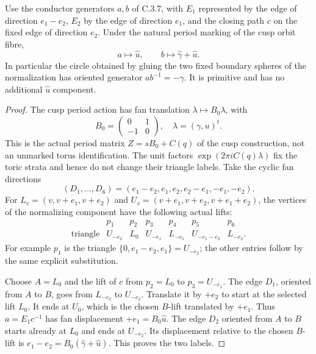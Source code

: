 \begin{lemma}
Use the conductor generators \(a,b\) of C.3.7, with
\(E_1\) represented by the edge of direction \(e_1-e_2\),
\(E_2\) by the edge of direction \(e_1\), and the closing path
\(c\) on the fixed edge of direction \(e_2\). Under the
natural period marking of the cusp orbit fibre,
\[
 a\longmapsto\widehat u,\qquad
 b\longmapsto\widehat\gamma+\widehat u.
\]
In particular the circle obtained by gluing the two fixed boundary
spheres of the normalization has oriented generator
\(ab^{-1}=-\widehat\gamma\). It is primitive and has no
additional \(\widehat u\) component.
\end{lemma}
\begin{proof}
The cusp period action has fan translation
\(\lambda\mapsto B_0\lambda\), with
\[
 B_0=\begin{pmatrix}0&1\\-1&0\end{pmatrix},
 \quad \lambda=(\gamma,u)^t.
\]
This is the actual period matrix
\(Z=sB_0+C(q)\) of the cusp construction, not an unmarked
torus identification. The unit factors \(\exp(2\pi i C(q)\lambda)\)
fix the toric strata and hence do not change their triangle labels.
Take the cyclic fan directions
\[
 (D_1,\ldots,D_6)=
 (e_1-e_2,e_1,e_2,e_2-e_1,-e_1,-e_2).
\]
For \(L_v=(v,v+e_1,v+e_2)\) and
\(U_v=(v+e_1,v+e_2,v+e_1+e_2)\), the vertices of the
normalizing component have the following actual lifts:
\[
 \begin{array}{c|cccccc}
 &p_1&p_2&p_3&p_4&p_5&p_6\\\hline
 \text{triangle}&U_{-e_2}&L_0&U_{-e_1}&L_{-e_1}
                 &U_{-e_1-e_2}&L_{-e_2}.
 \end{array}
\]
For example \(p_1\) is the triangle
\(\{0,e_1-e_2,e_1\}=U_{-e_2}\); the other entries follow
by the same explicit substitution.

Choose \(A=L_0\) and the lift of \(c\) from
\(p_2=L_0\) to \(p_3=U_{-e_1}\).
The edge \(D_1\), oriented from \(A\) to \(B\), goes
from \(L_{-e_2}\) to \(U_{-e_2}\). Translate it by
\(+e_2\) to start at the selected lift \(L_0\).
It ends at \(U_0\), which is the chosen \(B\)-lift
translated by \(+e_1\). Thus \(a=E_1c^{-1}\) has
fan displacement \(+e_1=B_0\widehat u\).
The edge \(D_2\) oriented from \(A\) to \(B\)
starts already at \(L_0\) and ends at \(U_{-e_2}\).
Its displacement relative to the chosen \(B\)-lift is
\(e_1-e_2=B_0(\widehat\gamma+\widehat u)\).
This proves the two labels.


\end{proof}
